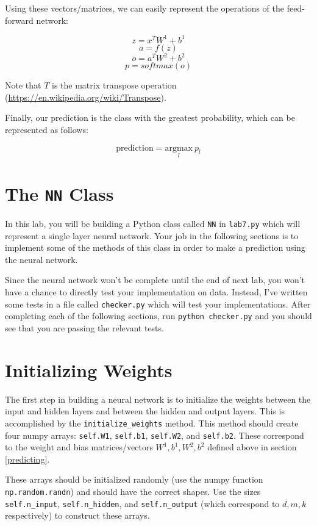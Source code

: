 \documentclass{article}
\begin{document}
\noindent
Using these vectors/matrices, we can easily represent the operations of the feed-forward network:

$$z = x^T W^1 + b^1$$
$$a = f(z)$$
$$o = a^T W^2 + b^2$$
$$p = softmax(o)$$

\noindent
Note that $T$ is the matrix transpose operation (\url{https://en.wikipedia.org/wiki/Transpose}).

\vspace{3mm}

Finally, our prediction is the class with the greatest probability, which can be represented as follows:

$$\textrm{prediction} = \underset{l}{\textrm{argmax}}\ p_l$$

\section{The \texttt{NN} Class}

In this lab, you will be building a Python class called \texttt{NN} in \texttt{lab7.py} which will represent a single layer neural network. Your job in the following sections is to implement some of the methods of this class in order to make a prediction using the neural network.

Since the neural network won't be complete until the end of next lab, you won't have a chance to directly test your implementation on data. Instead, I've written some tests in a file called \texttt{checker.py} which will test your implementations. After completing each of the following sections, run \texttt{python checker.py} and you should see that you are passing the relevant tests.

\section{Initializing Weights}

The first step in building a neural network is to initialize the weights between the input and hidden layers and between the hidden and output layers. This is accomplished by the \texttt{initialize\_weights} method. This method should create four numpy arrays: \texttt{self.W1}, \texttt{self.b1}, \texttt{self.W2}, and \texttt{self.b2}. These correspond to the weight and bias matrices/vectors $W^1, b^1, W^2, b^2$ defined above in section \ref{predicting}.

These arrays should be initialized randomly (use the numpy function \texttt{np.random.randn}) and should have the correct shapes. Use the sizes \texttt{self.n\_input}, \texttt{self.n\_hidden}, and \texttt{self.n\_output} (which correspond to $d, m, k$ respectively) to construct these arrays.
\end{document}
